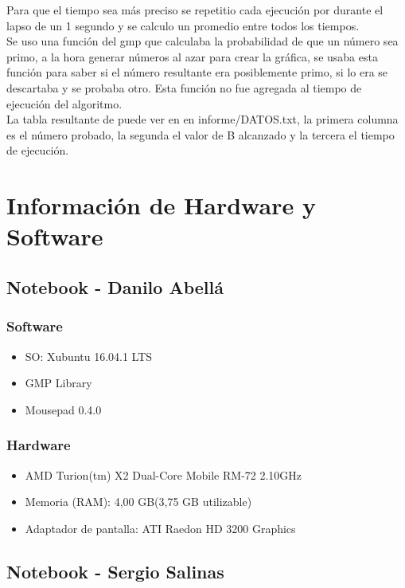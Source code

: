 \documentclass[12pt,letterpaper]{scrartcl}
\begin{document}
Para que el tiempo sea más preciso se repetitio cada ejecución por durante el lapso de un 1 segundo y se calculo un promedio entre todos los tiempos.\\

Se uso una función del gmp que calculaba la probabilidad de que un número sea primo, a la hora generar números al azar para crear la gráfica, se usaba esta función para saber si el número resultante era posiblemente primo, si lo era se descartaba y se probaba otro. Esta función no fue agregada al tiempo de ejecución del algoritmo.\\

La tabla resultante de puede ver en en informe/DATOS.txt, la primera columna es el número probado, la segunda el valor de B alcanzado y la tercera el tiempo de ejecución.\\
\newpage

\section{Información de Hardware y Software}

\subsection{ Notebook - Danilo Abellá}
\subsubsection{Software}
\begin{itemize}
\item SO: Xubuntu 16.04.1 LTS
\item GMP Library
\item Mousepad 0.4.0
\end{itemize}

\subsubsection{Hardware}
\begin{itemize}
\item AMD Turion(tm) X2 Dual-Core Mobile RM-72 2.10GHz
\item Memoria (RAM): 4,00 GB(3,75 GB utilizable)
\item Adaptador de pantalla: ATI Raedon HD 3200 Graphics
\end{itemize}



\subsection{Notebook - Sergio Salinas}
\end{document}
